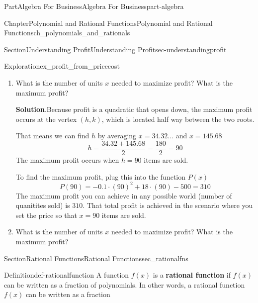 \documentclass{tufte-book}
\newcommand{\blocktitlefont}{\relax}
\newcommand{\terminology}[1]{\textbf{#1}}
\numberwithin{equation}{chapter}
\begin{document}
\begin{partptx}{Part}{Algebra For Business}{}{Algebra For Business}{}{}{part-algebra}
\begin{chapterptx}{Chapter}{Polynomial and Rational Functions}{}{Polynomial and Rational Functions}{}{}{ch_polynomials_and_rationals}
\begin{sectionptx}{Section}{Understanding Profit}{}{Understanding Profit}{}{}{sec-understandingprofit}
\begin{exploration}{Exploration}{}{ex_profit_from_pricecost}
\begin{enumerate}[font=\bfseries,label=(\alph*),ref=\alph*]
You can solve this equation using the quadratic equation or by factoring.  This function does not have a nice factorization, so we use the quadratic equation%
\begin{equation*}
x = \dfrac{ -18 \pm \sqrt{18^2 - 4\cdot (-0.1)\cdot (-500)} }{2\cdot (-1)}
\end{equation*}
This gives us \(x=34.32\dots\) or \(x=145.68\)%
\item{}What is the number of units \(x\) needed to maximize profit?  What is the maximum profit?%
\par\smallskip%
\noindent\textbf{\blocktitlefont Solution}.\hypertarget{ex_profit_from_pricecost-6-2}{}\quad{}Because profit is a quadratic that opens down, the maximum profit occurs at the vertex \((h,k)\), which is located half way between the two roots.%
\par
That means we can find \(h\) by averaging  \(x=34.32\dots\) and \(x=145.68\)%
\begin{equation*}
h = \dfrac{34.32 + 145.68}{2} = \dfrac{180}{2} = 90
\end{equation*}
The maximum profit occurs when \(h=90\) items are sold.%
\par
To find the maximum profit, plug this into the function \(P(x)\)%
\begin{equation*}
P(90) = -0.1 \cdot  (90)^2 + 18\cdot (90) - 500 = 310
\end{equation*}
The maximum profit you can achieve in any possible world (number of quanitites sold) is \textdollar{}\(310\).  That total profit is achieved in the scenario where you set the price so that \(x=90\) items are sold.%
\item{}What is the number of units \(x\) needed to maximize profit?  What is the maximum profit?%
\end{enumerate}%
\end{exploration}%
\end{sectionptx}
%
%
\typeout{************************************************}
\typeout{************************************************}
%
\begin{sectionptx}{Section}{Rational Functions}{}{Rational Functions}{}{}{sec_rationalfns}
\begin{definition}{Definition}{}{def-rationalfunction}%
A function \(f(x)\) is a \terminology{rational function} if \(f(x)\) can be written as a fraction of polynomials. In other words, a rational function \(f(x)\) can be written as a fraction%
\begin{equation*}

\end{equation*}
\end{definition}
\end{sectionptx}
\end{chapterptx}
\end{partptx}
\end{document}
